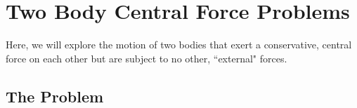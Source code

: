 \chapter{Two Body Central Force Problems}
Here, we will explore the motion of two bodies that exert a conservative, central force on each other but are subject to no other, ``external" forces.      
\section{The Problem}

